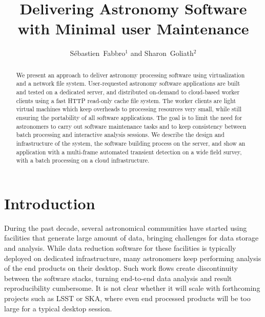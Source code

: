 
\resetcounters




\title{Delivering Astronomy Software with Minimal user Maintenance}

\author{S\'ebastien~Fabbro$^1$ and Sharon~Goliath$^2$
}


\begin{abstract}
  We present an approach to deliver astronomy processing software using
  virtualization and a network file system. User-requested astronomy
  software applications are built and tested on a dedicated server, and
  distributed on-demand to cloud-based worker clients using a fast HTTP
  read-only cache file system. The worker clients are light virtual
  machines which keep overheads to processing resources very small,
  while still ensuring the portability of all software applications. The
  goal is to limit the need for astronomers to carry out software
  maintenance tasks and to keep consistency between batch processing
  and interactive analysis sessions. We describe the design and
  infrastructure of the system, the software building process on the
  server, and show an application with a multi-frame automated
  transient detection on a wide field survey, with a batch processing
  on a cloud infrastructure.
\end{abstract}

\section{Introduction}
During the past decade, several astronomical communities have started using
facilities that generate large amount of data, bringing challenges for
data storage and analysis. While data reduction
software for these facilities is typically deployed on dedicated
infrastructure, many astronomers keep performing analysis of the 
end products on their desktop. Such work flows create discontinuity between the
software stacks, turning end-to-end data analysis and result
reproducibility cumbersome. It is not clear whether it will scale
with forthcoming projects such as LSST or SKA, where even end
processed products will be too large for a typical desktop session.

